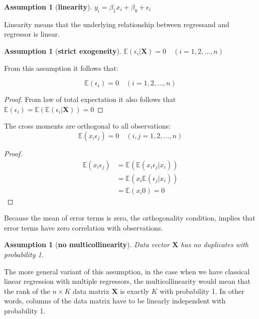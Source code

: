 \documentclass[12pt,a4paper,oneside]{book} %
\newtheorem{assumption}[theorem]{Assumption}
\newcommand{\E}{\mathbb{E}}
\begin{document}
\begin{assumption}[\textbf{linearity}]
	$y_i = \beta_1 x_i+\beta_0 +\epsilon_i$
\end{assumption}

Linearity means that the underlying relationship between regressand and regressor is linear. 

\begin{assumption}[\textbf{strict exogeneity}]
	$\E (\epsilon_i | \mathbf{X})=0 \quad (i=1,2,...,n)$ 
\end{assumption}

From this assumption it follows that:

\begin{equation}
\E (\epsilon_i ) =0 \quad (i=1,2,...,n)
\end{equation}

\begin{proof}
	From law of total expectation it also follows that $\E (\epsilon_i ) = \E (\E (\epsilon_i | \mathbf{X}))=0$
\end{proof}

The cross moments are orthogonal to all observations:
\begin{equation}
	\E (x_i \epsilon_j)=0  \quad (i,j = 1, 2, ..., n) 
\end{equation}

\begin{proof}
	\begin{align*}
		\E (x_i \epsilon_j) &= \E (\E(x_i \epsilon_j| x_i))\tag*{(by law of total expectation)} \\
		& =\E (x_i\E( \epsilon_j| x_i)) \tag*{(by linearity of expectation)} \\
		&= \E (x_i 0) 	= 0
	\end{align*}
\end{proof}

Because the mean of error terms is zero, the orthogonality condition, implies that error terms have zero correlation with observations.

\begin{assumption}[\textbf{no multicollinearity}]
	Data vector $\mathbf{X}$ has no duplicates with probability 1.
\end{assumption}

The more general variant of this assumption, in the case when we have classical linear regression with multiple regressors, the multicollinearity would mean that the rank of the $n \times K$ data matrix $\mathbf{X}$ is exactly $K$ with probability 1. In other words, columns of the data matrix have to be linearly independent with probability 1.
\end{document}
